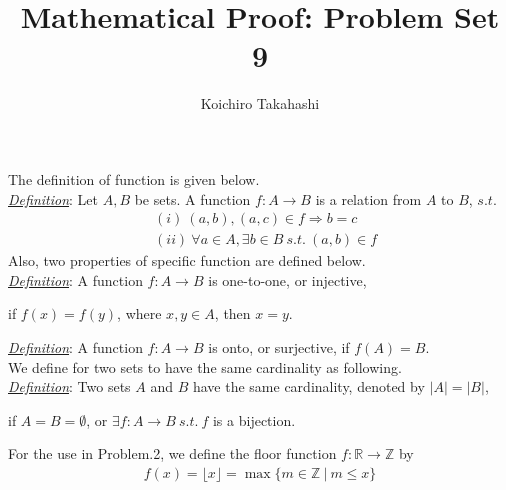 \documentclass[12pt]{article}
\begin{document}
\title{Mathematical Proof: Problem Set 9}
\author{Koichiro Takahashi}
\maketitle
\noindent The definition of function is given below.\\[1em]
\underline{\textit{Definition}}:
Let $A,B$ be sets. A function $f: A \longrightarrow B$ is a relation from $A$ to $B$, $s.t.$
\begin{align*}
&(i)~(a,b), (a,c) \in f \Rightarrow b = c\\[1em]
&(ii)~\forall a \in A, \exists b \in B ~s.t.~ (a,b) \in f
\end{align*}
Also, two properties of specific function are defined below.\\[1em]
\underline{\textit{Definition}}:
A function $f: A \longrightarrow B$ is one-to-one, or injective,
\begin{center}
if $f(x) = f(y)$, where $x,y \in A$, then $x = y$.
\end{center}
\underline{\textit{Definition}}:
A function $f: A \longrightarrow B$ is onto, or surjective, if $f(A) = B$.\\[1em]
We define for two sets to have the same cardinality as following.\\[1em]
\underline{\textit{Definition}}:
Two sets $A$ and $B$ have the same cardinality, denoted by $|A| = |B|$,
\begin{center}
if $A = B = \emptyset$, or $\exists f: A \longrightarrow B ~s.t.~f$ is a bijection.    
\end{center}
For the use in Problem.2, we define the floor function $f: \mathbb{R} \longrightarrow \mathbb{Z}$ by
\begin{gather*}
f(x) = \lfloor x \rfloor = \max \{m \in \mathbb{Z} ~|~ m \leq x \}
\end{gather*}
\end{document}
